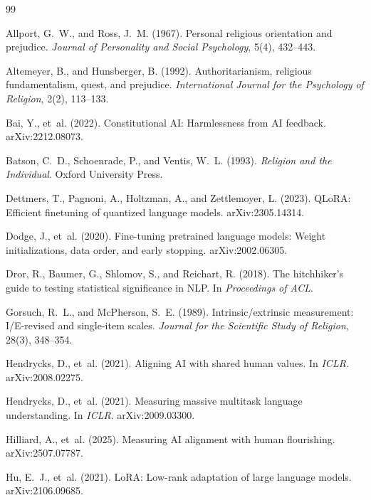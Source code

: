 \documentclass[11pt]{article}
\begin{document}
\begin{thebibliography}{99}

Allport, G.~W., and Ross, J.~M. (1967). Personal religious orientation and prejudice. \emph{Journal of Personality and Social Psychology}, 5(4), 432--443.

Altemeyer, B., and Hunsberger, B. (1992). Authoritarianism, religious fundamentalism, quest, and prejudice. \emph{International Journal for the Psychology of Religion}, 2(2), 113--133.

Bai, Y., et~al. (2022). Constitutional AI: Harmlessness from AI feedback. arXiv:2212.08073.

Batson, C.~D., Schoenrade, P., and Ventis, W.~L. (1993). \emph{Religion and the Individual}. Oxford University Press.

Dettmers, T., Pagnoni, A., Holtzman, A., and Zettlemoyer, L. (2023). QLoRA: Efficient finetuning of quantized language models. arXiv:2305.14314.

Dodge, J., et~al. (2020). Fine-tuning pretrained language models: Weight initializations, data order, and early stopping. arXiv:2002.06305.

Dror, R., Baumer, G., Shlomov, S., and Reichart, R. (2018). The hitchhiker's guide to testing statistical significance in NLP. In \emph{Proceedings of ACL}.

Gorsuch, R.~L., and McPherson, S.~E. (1989). Intrinsic/extrinsic measurement: I/E-revised and single-item scales. \emph{Journal for the Scientific Study of Religion}, 28(3), 348--354.

Hendrycks, D., et~al. (2021). Aligning AI with shared human values. In \emph{ICLR}. arXiv:2008.02275.

Hendrycks, D., et~al. (2021). Measuring massive multitask language understanding. In \emph{ICLR}. arXiv:2009.03300.

Hilliard, A., et~al. (2025). Measuring AI alignment with human flourishing. arXiv:2507.07787.

Hu, E.~J., et~al. (2021). LoRA: Low-rank adaptation of large language models. arXiv:2106.09685.


\end{thebibliography}
\end{document}
